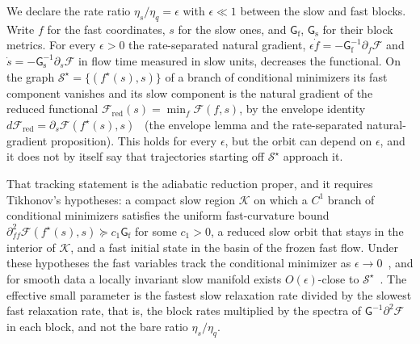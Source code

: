 \documentclass[11pt]{article}
\begin{document}
We declare the rate ratio $\eta_s/\eta_q = \epsilon$ with $\epsilon \ll 1$ between the slow and fast blocks. Write $f$ for the fast coordinates, $s$ for the slow ones, and $\mathsf G_{\mathrm f}$, $\mathsf G_{\mathrm s}$ for their block metrics. For every $\epsilon > 0$ the rate-separated natural gradient, $\epsilon\dot f = -\mathsf G_{\mathrm f}^{-1}\partial_f\mathcal{F}$ and $\dot s = -\mathsf G_{\mathrm s}^{-1}\partial_s\mathcal{F}$ in flow time measured in slow units, decreases the functional. On the graph $\mathcal{S}^\star = \{(f^\star(s), s)\}$ of a branch of conditional minimizers its fast component vanishes and its slow component is the natural gradient of the reduced functional $\mathcal{F}_{\mathrm{red}}(s) = \min_f \mathcal{F}(f, s)$, by the envelope identity $d\mathcal{F}_{\mathrm{red}} = \partial_s\mathcal{F}(f^\star(s), s)$~\cite[Ch.~8]{DennisGaugeVFE2026} (the envelope lemma and the rate-separated natural-gradient proposition). This holds for every $\epsilon$, but the orbit can depend on $\epsilon$, and it does not by itself say that trajectories starting off $\mathcal{S}^\star$ approach it.

That tracking statement is the adiabatic reduction proper, and it requires Tikhonov's hypotheses: a compact slow region $\mathcal{K}$ on which a $C^1$ branch of conditional minimizers satisfies the uniform fast-curvature bound $\partial^2_{ff}\mathcal{F}(f^\star(s), s) \succeq c_1 \mathsf G_{\mathrm f}$ for some $c_1 > 0$, a reduced slow orbit that stays in the interior of $\mathcal{K}$, and a fast initial state in the basin of the frozen fast flow. Under these hypotheses the fast variables track the conditional minimizer as $\epsilon \to 0$~\cite{Tikhonov1952}, and for smooth data a locally invariant slow manifold exists $O(\epsilon)$-close to $\mathcal{S}^\star$~\cite{fenichel1979geometric}. The effective small parameter is the fastest slow relaxation rate divided by the slowest fast relaxation rate, that is, the block rates multiplied by the spectra of $\mathsf G^{-1}\partial^2\mathcal{F}$ in each block, and not the bare ratio $\eta_s/\eta_q$.
\end{document}
